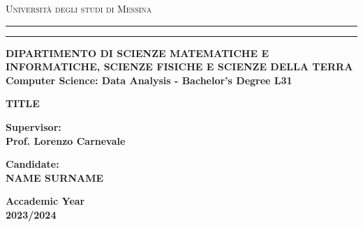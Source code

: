 \begin{titlepage}
    \begin{center}
        {{\Large{\textsc{Universit\`a degli studi di
        Messina}}}} \rule[0.1cm]{15.8cm}{0.1mm}
        \rule[0.5cm]{15.8cm}{0.6mm}
        {\small{\bf DIPARTIMENTO DI SCIENZE MATEMATICHE E INFORMATICHE, SCIENZE FISICHE E SCIENZE DELLA TERRA\\
        Computer Science: Data Analysis - Bachelor's Degree L31}}
    \end{center}
    \vspace{15mm}
    
    \begin{center}
        {\LARGE{\bf TITLE}}\\
    \end{center}
    
    \vspace{40mm}
    \par
    
    \noindent
    \begin{minipage}[t]{.5\textwidth}
        \large{
            \bf Supervisor: \\ %
            Prof. Lorenzo Carnevale
        }
    \end{minipage}
    \hfill
    \begin{minipage}[t]{.5\textwidth}
        \raggedleft
        \large{
            \bf Candidate:\\ %
            NAME SURNAME
        }
    \end{minipage}
    
    \vspace{20mm}
    
    \begin{center}{
        \large{
            \bf Accademic Year \\ %
            2023/2024
            }
        }
    \end{center}
\end{titlepage}
